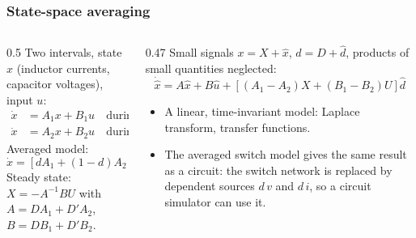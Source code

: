 \begin{frame}
	\frametitle{State-space averaging}
	\begin{columns}[T]
		\begin{column}{0.5\textwidth}
			\small
			Two intervals, state $x$ (inductor currents, capacitor voltages), input $u$:
			\begin{align*}
				\dot{x} & =A_1x+B_1u\quad\text{during }dT_\mathrm{s}     \\
				\dot{x} & =A_2x+B_2u\quad\text{during }(1-d)T_\mathrm{s}
			\end{align*}
			Averaged model:
			\begin{equation*}
				\dot{x}=\left[dA_1+(1-d)A_2\right]x+\left[dB_1+(1-d)B_2\right]u
			\end{equation*}
			Steady state: $X=-A^{-1}BU$ with $A=DA_1+D'A_2$, $B=DB_1+D'B_2$.
		\end{column}
		\begin{column}{0.47\textwidth}
			\small
			Small signals $x=X+\hat{x}$, $d=D+\hat{d}$, products of small quantities neglected:
			\begin{equation*}
				\dot{\hat{x}}=A\hat{x}+B\hat{u}+\left[(A_1-A_2)X+(B_1-B_2)U\right]\hat{d}
			\end{equation*}
			\begin{itemize}
				\item A linear, time-invariant model: Laplace transform, transfer functions.
				\item The averaged switch model gives the same result as a circuit: the switch network is replaced by dependent sources $d\,v$ and $d\,i$, so a circuit simulator can use it.
			\end{itemize}
		\end{column}
	\end{columns}
\end{frame}

